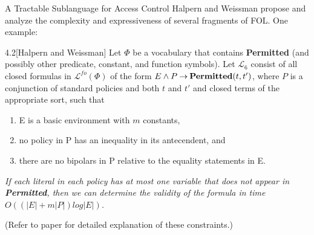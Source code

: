 \documentclass[style=sailor,size=12pt]{powerdot}
\begin{document}
\begin{wideslide}[bm=,toc=]{A Tractable Sublanguage for Access
  Control}
Halpern and Weissman propose and analyze the complexity and expressiveness
of several fragments of FOL. One example:
\begin{thm}{4.2}[Halpern and Weissman]
Let $\Phi$ be a vocabulary that contains {\bf Permitted} (and possibly
other predicate, constant, and function symbols). Let $\mathcal{L}_6$
consist of all closed formulas in $\mathcal{L}^{fo}(\Phi)$ of the
form $E \land P \mathbin{\rightarrow} \mbox{\bf Permitted}(t,t')$, where $P$ is a conjunction
of standard policies and both $t$ and $t'$ and closed terms of the
appropriate sort, such that
\end{thm}
\vspace{-2ex}
\begin{enumerate}
\renewcommand{\labelenumi}{\alph{enumi})}
\item E is a basic environment with $m$ constants,
\item no policy in P has an inequality in its antecendent, and
\item there are no bipolars in P relative to the equality statements
in E.
\end{enumerate}
\emph{If each literal in each policy has at most one variable
  that does not appear in {\bf Permitted}, then we can determine
    the validity of the formula in time $O((|E| + m|P|)log|E|)$.}

    {\tiny (Refer to paper for detailed explanation of these constraints.)}
\end{wideslide}
\end{document}
